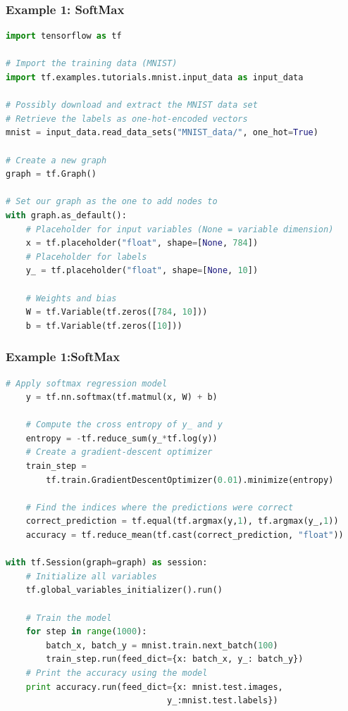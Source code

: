\begin{frame}[fragile]
  \MyLogo
  \frametitle{Example 1: SoftMax}  
 
\scriptsize{
\begin{lstlisting}[language=python]
import tensorflow as tf

# Import the training data (MNIST)
import tf.examples.tutorials.mnist.input_data as input_data

# Possibly download and extract the MNIST data set
# Retrieve the labels as one-hot-encoded vectors
mnist = input_data.read_data_sets("MNIST_data/", one_hot=True)

# Create a new graph
graph = tf.Graph()

# Set our graph as the one to add nodes to
with graph.as_default():
	# Placeholder for input variables (None = variable dimension)
	x = tf.placeholder("float", shape=[None, 784])
	# Placeholder for labels
	y_ = tf.placeholder("float", shape=[None, 10])
	
	# Weights and bias
	W = tf.Variable(tf.zeros([784, 10]))
	b = tf.Variable(tf.zeros([10])) 
\end{lstlisting}
}
\end{frame}

\begin{frame}[fragile]
  \MyLogo
  \frametitle{Example 1:SoftMax}  
\scriptsize{
\begin{lstlisting}[language=python]
	# Apply softmax regression model
	y = tf.nn.softmax(tf.matmul(x, W) + b)
	
	# Compute the cross entropy of y_ and y
	entropy = -tf.reduce_sum(y_*tf.log(y))
	# Create a gradient-descent optimizer
	train_step = 
		tf.train.GradientDescentOptimizer(0.01).minimize(entropy)
		
	# Find the indices where the predictions were correct
	correct_prediction = tf.equal(tf.argmax(y,1), tf.argmax(y_,1))
	accuracy = tf.reduce_mean(tf.cast(correct_prediction, "float"))

with tf.Session(graph=graph) as session:
	# Initialize all variables
	tf.global_variables_initializer().run()
	
	# Train the model
	for step in range(1000):
		batch_x, batch_y = mnist.train.next_batch(100)
		train_step.run(feed_dict={x: batch_x, y_: batch_y})
	# Print the accuracy using the model
	print accuracy.run(feed_dict={x: mnist.test.images, 
								y_:mnist.test.labels})
\end{lstlisting}
}


\end{frame}